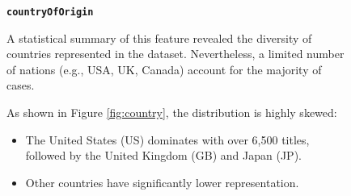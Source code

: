 \documentclass[10pt]{article}
\begin{document}
\begin{figure}[H]
    \begin{minipage}{0.45\textwidth}
        \textbf{\texttt{countryOfOrigin}}\par
        A statistical summary of this feature revealed the diversity of countries represented in the dataset. Nevertheless, a limited number of nations (e.g., USA, UK, Canada) account for the majority of cases. 


        As shown in Figure \ref{fig:country}, the distribution is highly skewed:
        \begin{itemize}
            \item The United States (US) dominates with over 6,500 titles, followed by the United Kingdom (GB) and Japan (JP).
            \item Other countries have significantly lower representation.
        \end{itemize}
        

\end{minipage}
\end{figure}
\end{document}
